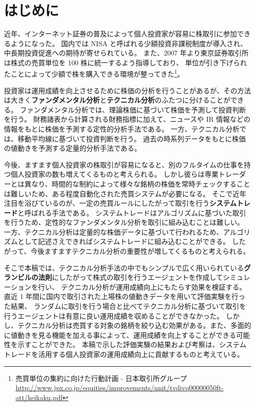 \documentclass[twocolumn,jsaiac]{jarticle}
\title{
    \jtitle{真のゴールデンクロスは存在するか？}
}
\author{
    \jname{37-147308 飯塚 修平}
}
\begin{document}
\maketitle
\section{はじめに}
近年、インターネット証券の普及によって個人投資家が容易に株取引に参加できるようになった。
国内では NISA と呼ばれる少額投資非課税制度が導入され、中長期投資促進への期待が寄せられている\cite{nisa}。
また、2007 年より東京証券取引所は株式の売買単位を 100 株に統一するよう指導しており、
単位が引き下げられたことによって少額で株を購入できる環境が整ってきた\footnote{
  売買単位の集約に向けた行動計画 - 日本取引所グループ \url{http://www.jpx.co.jp/equities/improvements/unit/tvdivq00000050ft-att/keikaku.pdf}}。

投資家は運用成績を向上させるために株価の分析を行うことがあるが、その方法は大きく{\bf ファンダメンタル分析}と{\bf テクニカル分析}のふたつに分けることができる。
ファンダメンタル分析では、理論株価に基づいて株価を予測して投資判断を行う。
財務諸表から計算される財務指標に加えて、ニュースや IR 情報などの情報をもとに株価を予測する定性的分析手法である。
一方、テクニカル分析では、移動平均線に基づいて投資判断を行う。
過去の時系列データをもとに株価の値動きを予測する定量的分析手法である\cite{ga}。

今後、ますます個人投資家の株取引が容易になると、別のフルタイムの仕事を持つ個人投資家の数も増えてくるものと考えられる。
しかし彼らは専業トレーダーとは異なり、時間的な制約によって様々な銘柄の株価を常時チェックすることは難しいため、ある程度自動化された売買システムが必要になる。
そこで近年注目を浴びているのが、一定の売買ルールにしたがって取引を行う{\bf システムトレード}と呼ばれる手法である\cite{short}。
システムトレードはアルゴリズムに基づいた取引を行うため、定性的なファンダメンタル分析を取引に組み込むことは難しい。
一方、テクニカル分析は定量的な株価データに基づいて行われるため、アルゴリズムとして記述さえできればシステムトレードに組み込むことができる。
したがって、今後ますますテクニカル分析の重要性が増してくるものと考えられる。

そこで本稿では、テクニカル分析手法の中でもシンプルで広く用いられている{\bf グランビルの法則}にしたがって株式の取引を行うエージェントを作成してシミュレーションを行い、
テクニカル分析が運用成績向上にもたらす効果を検証する。
直近 1 年間に国内で取引された上場株の値動きデータを用いて評価実験を行った結果、
ランダムに取引を行う場合と比べてテクニカル分析に基づいて取引を行うエージェントは有意に良い運用成績を収めることができなかった。
しかし、テクニカル分析は売買する対象の銘柄を絞り込む効果がある。また、多面的に値動きを見る機能を加える事によって、運用成績を向上することができる可能性を示すことができた。
本稿で示した評価実験の結果および考察は、システムトレードを活用する個人投資家の運用成績向上に貢献するものと考えている。
\end{document}
